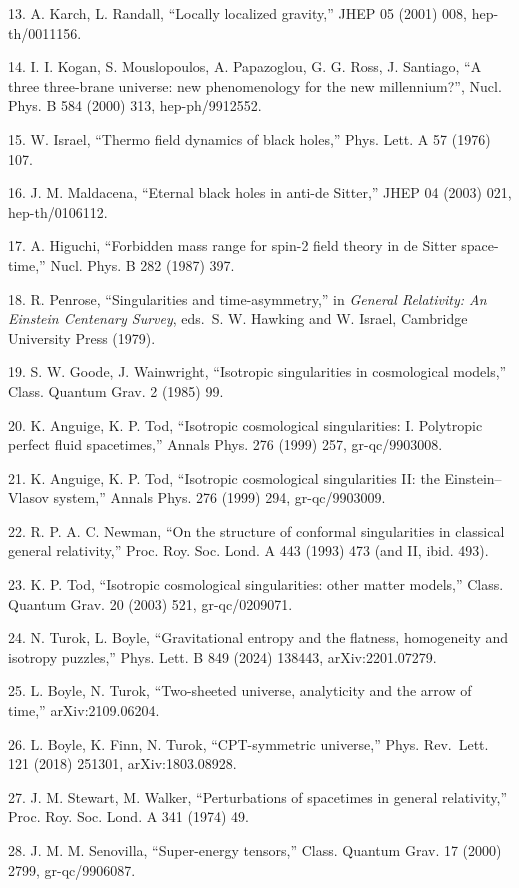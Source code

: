 \documentclass[
]{article}
\begin{document}
13. A. Karch, L. Randall, ``Locally localized gravity,'' JHEP 05 (2001)
008, hep-th/0011156.

14. I. I. Kogan, S. Mouslopoulos, A. Papazoglou, G. G. Ross, J.
Santiago, ``A three three-brane universe: new phenomenology for the new
millennium?'', Nucl. Phys. B 584 (2000) 313, hep-ph/9912552.

15. W. Israel, ``Thermo field dynamics of black holes,'' Phys. Lett. A
57 (1976) 107.

16. J. M. Maldacena, ``Eternal black holes in anti-de Sitter,'' JHEP 04
(2003) 021, hep-th/0106112.

17. A. Higuchi, ``Forbidden mass range for spin-2 field theory in de
Sitter space-time,'' Nucl. Phys. B 282 (1987) 397.

18. R. Penrose, ``Singularities and time-asymmetry,'' in \emph{General
Relativity: An Einstein Centenary Survey}, eds.~S. W. Hawking and W.
Israel, Cambridge University Press (1979).

19. S. W. Goode, J. Wainwright, ``Isotropic singularities in
cosmological models,'' Class. Quantum Grav. 2 (1985) 99.

20. K. Anguige, K. P. Tod, ``Isotropic cosmological singularities: I.
Polytropic perfect fluid spacetimes,'' Annals Phys. 276 (1999) 257,
gr-qc/9903008.

21. K. Anguige, K. P. Tod, ``Isotropic cosmological singularities II:
the Einstein--Vlasov system,'' Annals Phys. 276 (1999) 294,
gr-qc/9903009.

22. R. P. A. C. Newman, ``On the structure of conformal singularities in
classical general relativity,'' Proc. Roy. Soc. Lond. A 443 (1993) 473
(and II, ibid. 493).

23. K. P. Tod, ``Isotropic cosmological singularities: other matter
models,'' Class. Quantum Grav. 20 (2003) 521, gr-qc/0209071.

24. N. Turok, L. Boyle, ``Gravitational entropy and the flatness,
homogeneity and isotropy puzzles,'' Phys. Lett. B 849 (2024) 138443,
arXiv:2201.07279.

25. L. Boyle, N. Turok, ``Two-sheeted universe, analyticity and the
arrow of time,'' arXiv:2109.06204.

26. L. Boyle, K. Finn, N. Turok, ``CPT-symmetric universe,'' Phys.
Rev.~Lett. 121 (2018) 251301, arXiv:1803.08928.

27. J. M. Stewart, M. Walker, ``Perturbations of spacetimes in general
relativity,'' Proc. Roy. Soc. Lond. A 341 (1974) 49.

28. J. M. M. Senovilla, ``Super-energy tensors,'' Class. Quantum Grav.
17 (2000) 2799, gr-qc/9906087.
\end{document}
